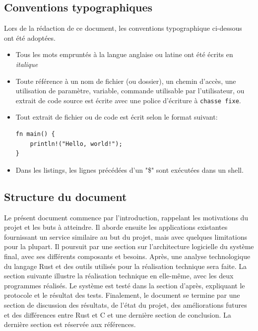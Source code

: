 \documentclass[a4paper, 12pt]{article}
\newenvironment{code}{\captionsetup{type=listing}}{}
\begin{document}
\subsection*{Conventions typographiques} %
Lors de la rédaction de ce document, les conventions typographique ci-dessous ont
été adoptées.
\begin{itemize}[label=\textbullet]
	\item Tous les mots empruntés à la langue anglaise ou latine ont été écrits en \textit{italique}
	\item Toute référence à un nom de fichier (ou dossier), un chemin d'accès, une 
    utilisation de paramètre, variable, commande utilisable par l'utilisateur, ou extrait de code 
    source est écrite avec une police d'écriture à \texttt{chasse fixe}.
	\item Tout extrait de fichier ou de code est écrit selon le format suivant:
    \bigbreak
    \begin{code}
        \begin{verbatim}
fn main() {
    println!("Hello, world!");
}
        \end{verbatim}
    \end{code}
    \item Dans les listings, les lignes précédées d'un "\$" sont exécutées dans un shell.
\end{itemize}

\subsection*{Structure du document} %
Le présent document commence par l'introduction, rappelant les motivations du projet et les buts à 
atteindre. Il aborde ensuite les applications existantes fournissant un service similaire au but du 
projet, mais avec quelques limitations pour la plupart. Il poursuit par une section sur l'architecture 
logicielle du système final, avec ses différents composants et besoins. Après, une analyse technologique du 
langage Rust et des outils utilisés pour la réalisation technique sera faite. La section suivante illustre 
la réalisation technique en elle-même, avec les deux programmes réalisés. Le système est testé dans 
la section d'après, expliquant le protocole et le résultat des tests. Finalement, le document se 
termine par une section de discussion des résultats, de l'état du projet, des améliorations futures 
et des différences entre Rust et C et une dernière section de conclusion. La dernière section 
est réservée aux références.
\end{document}
